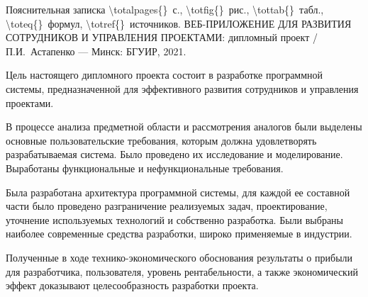 \thispagestyle{empty}


\begin{center}
    Пояснительная записка \num{\totalpages{}}~с., \num{\totfig{}}~рис., \num{\tottab{}}~табл., \num{\toteq{}}~формул, \num{\totref{}}~источников.
	\MakeUppercase{Веб-приложение для развития сотрудников и управления проектами}: дипломный проект / П.И.~Астапенко — Минск: БГУИР, 2021.
\end{center}

Цель настоящего дипломного проекта состоит в разработке программной системы, предназначенной для эффективного развития сотрудников и управления проектами.

В процессе анализа предметной области и рассмотрения аналогов были выделены основные пользовательские требования, которым должна удовлетворять разрабатываемая система. Было проведено их исследование и моделирование. Выработаны функциональные и нефункциональные требования.

Была разработана архитектура программной системы, для каждой ее составной части было проведено разграничение реализуемых задач, проектирование, уточнение используемых технологий и собственно разработка. Были выбраны наиболее современные средства разработки, широко применяемые в индустрии. 

Полученные в ходе технико-экономического обоснования результаты о прибыли для разработчика, пользователя, уровень рентабельности, а также экономический эффект доказывают целесообразность разработки проекта.
